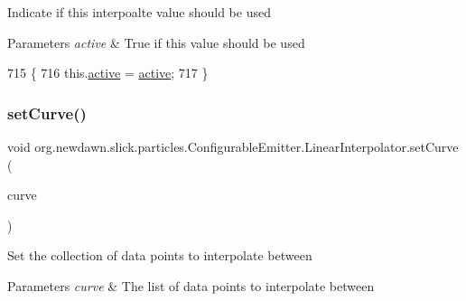 Indicate if this interpoalte value should be used


\begin{DoxyParams}{Parameters}
{\em active} & True if this value should be used \\
\hline
\end{DoxyParams}

\begin{DoxyCode}
715                                               \{
716             this.\mbox{\hyperlink{classorg_1_1newdawn_1_1slick_1_1particles_1_1_configurable_emitter_1_1_linear_interpolator_a0f28ab5311b6eaa1a406818811e39b54}{active}} = \mbox{\hyperlink{classorg_1_1newdawn_1_1slick_1_1particles_1_1_configurable_emitter_1_1_linear_interpolator_a0f28ab5311b6eaa1a406818811e39b54}{active}};
717         \}
\end{DoxyCode}
\mbox{\label{classorg_1_1newdawn_1_1slick_1_1particles_1_1_configurable_emitter_1_1_linear_interpolator_a1e16c59739d5b4dfa30b853118c896e4}} 
\subsubsection{\texorpdfstring{set\+Curve()}{setCurve()}}
{\footnotesize\ttfamily void org.\+newdawn.\+slick.\+particles.\+Configurable\+Emitter.\+Linear\+Interpolator.\+set\+Curve (\begin{DoxyParamCaption}\item[{Array\+List}]{curve }\end{DoxyParamCaption})\hspace{0.3cm}{\ttfamily [inline]}}

Set the collection of data points to interpolate between


\begin{DoxyParams}{Parameters}
{\em curve} & The list of data points to interpolate between \\
\hline
\end{DoxyParams}

